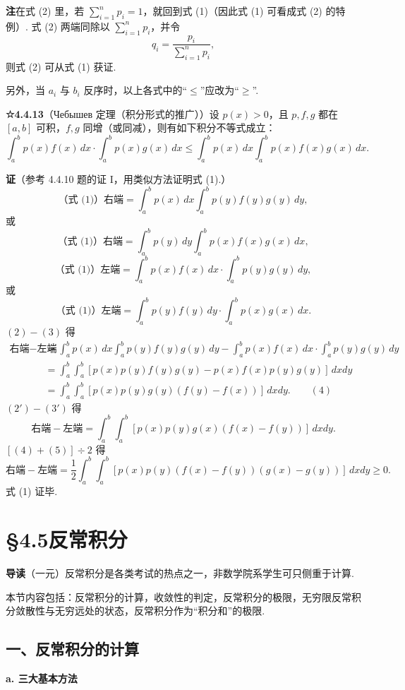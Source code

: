 \documentclass[UTF8, 12pt, fontset=fandol, oneside]{ctexart}
\begin{document}
\noindent\textbf{注}\quad 在式 (2) 里，若 $\sum_{i=1}^n p_i=1$，就回到式 (1)（因此式 (1) 可看成式 (2) 的特例）. 式 (2) 两端同除以 $\sum_{i=1}^n p_i$，并令
\[
q_i=\frac{p_i}{\sum_{i=1}^n p_i},
\]
则式 (2) 可从式 (1) 获证.

另外，当 $a_i$ 与 $b_i$ 反序时，以上各式中的“$\le$”应改为“$\ge$”.

\noindent\textbf{☆4.4.13}\quad （Чебышев 定理（积分形式的推广））设 $p(x)>0$，且 $p,f,g$ 都在 $[a,b]$ 可积，$f,g$ 同增（或同减），则有如下积分不等式成立：
\[
\int_a^b p(x)f(x)\,dx\cdot\int_a^b p(x)g(x)\,dx
\le\int_a^b p(x)\,dx\int_a^b p(x)f(x)g(x)\,dx. \tag{1}
\]

\noindent\textbf{证}\quad （参考 4.4.10 题的证 I，用类似方法证明式 (1).）
\[
\text{（式 (1)）右端}
=\int_a^b p(x)\,dx\int_a^b p(y)f(y)g(y)\,dy, \tag{2}
\]
或
\[
\text{（式 (1)）右端}
=\int_a^b p(y)\,dy\int_a^b p(x)f(x)g(x)\,dx, \tag{$2'$}
\]
\[
\text{（式 (1)）左端}
=\int_a^b p(x)f(x)\,dx\cdot\int_a^b p(y)g(y)\,dy, \tag{3}
\]
或
\[
\text{（式 (1)）左端}
=\int_a^b p(y)f(y)\,dy\cdot\int_a^b p(x)g(x)\,dx. \tag{$3'$}
\]
$(2)-(3)$ 得
\[
\begin{aligned}
\text{右端}-\text{左端}
&=\int_a^b p(x)\,dx\int_a^b p(y)f(y)g(y)\,dy
-\int_a^b p(x)f(x)\,dx\cdot\int_a^b p(y)g(y)\,dy\\
&=\int_a^b\int_a^b
[p(x)p(y)f(y)g(y)-p(x)f(x)p(y)g(y)]\,dxdy\\
&=\int_a^b\int_a^b[p(x)p(y)g(y)(f(y)-f(x))]\,dxdy. \qquad(4)
\end{aligned}
\]
$(2')-(3')$ 得
\[
\text{右端}-\text{左端}
=\int_a^b\int_a^b[p(x)p(y)g(x)(f(x)-f(y))]\,dxdy. \tag{5}
\]
$[(4)+(5)]\div2$ 得
\[
\text{右端}-\text{左端}
=\frac12\int_a^b\int_a^b
[p(x)p(y)(f(x)-f(y))(g(x)-g(y))]\,dxdy\ge0.
\]
式 (1) 证毕.

\section*{§4.5\quad 反常积分}

\noindent\textbf{导读}\quad （一元）反常积分是各类考试的热点之一，非数学院系学生可只侧重于计算.

本节内容包括：反常积分的计算，收敛性的判定，反常积分的极限，无穷限反常积分敛散性与无穷远处的状态，反常积分作为“积分和”的极限.

\subsection*{一、反常积分的计算}

\noindent\textbf{a. 三大基本方法}
\end{document}

